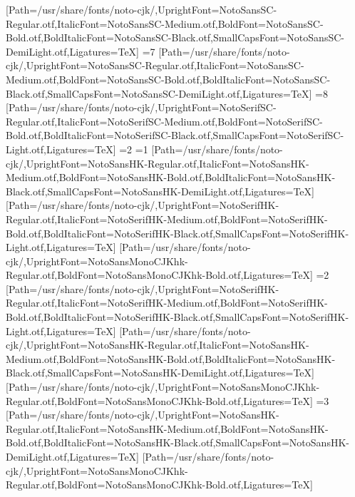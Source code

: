 [Path=/usr/share/fonts/noto-cjk/,UprightFont=NotoSansSC-Regular.otf,ItalicFont=NotoSansSC-Medium.otf,BoldFont=NotoSansSC-Bold.otf,BoldItalicFont=NotoSansSC-Black.otf,SmallCapsFont=NotoSansSC-DemiLight.otf,Ligatures=TeX]
\else\ifnum\value{CJKFonts}=7
[Path=/usr/share/fonts/noto-cjk/,UprightFont=NotoSansSC-Regular.otf,ItalicFont=NotoSansSC-Medium.otf,BoldFont=NotoSansSC-Bold.otf,BoldItalicFont=NotoSansSC-Black.otf,SmallCapsFont=NotoSansSC-DemiLight.otf,Ligatures=TeX]
\else\ifnum\value{CJKFonts}=8
[Path=/usr/share/fonts/noto-cjk/,UprightFont=NotoSerifSC-Regular.otf,ItalicFont=NotoSerifSC-Medium.otf,BoldFont=NotoSerifSC-Bold.otf,BoldItalicFont=NotoSerifSC-Black.otf,SmallCapsFont=NotoSerifSC-Light.otf,Ligatures=TeX]
\fi\fi\fi\fi\fi\fi\fi\fi\else
\ifnum\value{CJKLanguage}=2
\ifnum\value{CJKFonts}=1
[Path=/usr/share/fonts/noto-cjk/,UprightFont=NotoSansHK-Regular.otf,ItalicFont=NotoSansHK-Medium.otf,BoldFont=NotoSansHK-Bold.otf,BoldItalicFont=NotoSansHK-Black.otf,SmallCapsFont=NotoSansHK-DemiLight.otf,Ligatures=TeX]
[Path=/usr/share/fonts/noto-cjk/,UprightFont=NotoSerifHK-Regular.otf,ItalicFont=NotoSerifHK-Medium.otf,BoldFont=NotoSerifHK-Bold.otf,BoldItalicFont=NotoSerifHK-Black.otf,SmallCapsFont=NotoSerifHK-Light.otf,Ligatures=TeX]
[Path=/usr/share/fonts/noto-cjk/,UprightFont=NotoSansMonoCJKhk-Regular.otf,BoldFont=NotoSansMonoCJKhk-Bold.otf,Ligatures=TeX]
\else\ifnum\value{CJKFonts}=2
[Path=/usr/share/fonts/noto-cjk/,UprightFont=NotoSerifHK-Regular.otf,ItalicFont=NotoSerifHK-Medium.otf,BoldFont=NotoSerifHK-Bold.otf,BoldItalicFont=NotoSerifHK-Black.otf,SmallCapsFont=NotoSerifHK-Light.otf,Ligatures=TeX]
[Path=/usr/share/fonts/noto-cjk/,UprightFont=NotoSansHK-Regular.otf,ItalicFont=NotoSansHK-Medium.otf,BoldFont=NotoSansHK-Bold.otf,BoldItalicFont=NotoSansHK-Black.otf,SmallCapsFont=NotoSansHK-DemiLight.otf,Ligatures=TeX]
[Path=/usr/share/fonts/noto-cjk/,UprightFont=NotoSansMonoCJKhk-Regular.otf,BoldFont=NotoSansMonoCJKhk-Bold.otf,Ligatures=TeX]
\else\ifnum\value{CJKFonts}=3
[Path=/usr/share/fonts/noto-cjk/,UprightFont=NotoSansHK-Regular.otf,ItalicFont=NotoSansHK-Medium.otf,BoldFont=NotoSansHK-Bold.otf,BoldItalicFont=NotoSansHK-Black.otf,SmallCapsFont=NotoSansHK-DemiLight.otf,Ligatures=TeX]
[Path=/usr/share/fonts/noto-cjk/,UprightFont=NotoSansMonoCJKhk-Regular.otf,BoldFont=NotoSansMonoCJKhk-Bold.otf,Ligatures=TeX]
